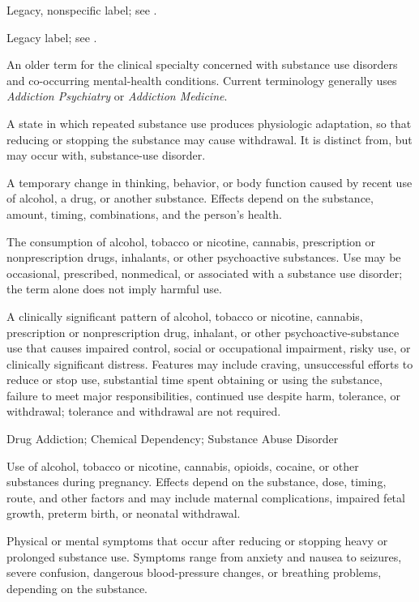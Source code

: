  Legacy, nonspecific label; see .

 Legacy label; see .

 An older term for the clinical specialty concerned with substance use disorders and co-occurring mental-health conditions. Current terminology generally uses \textit{Addiction Psychiatry} or \textit{Addiction Medicine}.

 A state in which repeated substance use produces physiologic adaptation, so that reducing or stopping the substance may cause withdrawal. It is distinct from, but may occur with, substance-use disorder.

 A temporary change in thinking, behavior, or body function caused by recent use of alcohol, a drug, or another substance. Effects depend on the substance, amount, timing, combinations, and the person’s health.

 The consumption of alcohol, tobacco or nicotine, cannabis, prescription or nonprescription drugs, inhalants, or other psychoactive substances. Use may be occasional, prescribed, nonmedical, or associated with a substance use disorder; the term alone does not imply harmful use.

 A clinically significant pattern of alcohol, tobacco or nicotine, cannabis, prescription or nonprescription drug, inhalant, or other psychoactive-substance use that causes impaired control, social or occupational impairment, risky use, or clinically significant distress. Features may include craving, unsuccessful efforts to reduce or stop use, substantial time spent obtaining or using the substance, failure to meet major responsibilities, continued use despite harm, tolerance, or withdrawal; tolerance and withdrawal are not required.

\synonyms
Drug Addiction; Chemical Dependency; Substance Abuse Disorder

 Use of alcohol, tobacco or nicotine, cannabis, opioids, cocaine, or other substances during pregnancy. Effects depend on the substance, dose, timing, route, and other factors and may include maternal complications, impaired fetal growth, preterm birth, or neonatal withdrawal.

 Physical or mental symptoms that occur after reducing or stopping heavy or prolonged substance use. Symptoms range from anxiety and nausea to seizures, severe confusion, dangerous blood-pressure changes, or breathing problems, depending on the substance.

